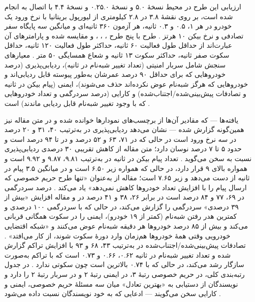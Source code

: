 ارزیابی این طرح در محیط  نسخهٔ ۵.۰ و  نسخهٔ ۰.۲۵.۰ و  نسخهٔ ۴.۴ با اتصال  به  انجام شده است، بر روی نقشهٔ ۳.۸ در ۲.۸ کیلومتری از لیورپول بریتانیا با نرخ ورود یک خودرو در هر ۱، ۰.۵ و ۰.۳ ثانیه، هر آزمون ۳۶۰ ثانیه‌ای و میانگین سه پایگاه سفر تصادفی و نرخ بیکن ۱۰ هرتز \cite{al-aniPrivacySafetyImprovement2023}. طرح  با پنج طرح ، ، ،  و  مقایسه شده و پارامترهای آن عبارت‌اند از حداقل طول فعالیت ۶۰ ثانیه، حداکثر طول فعالیت ۱۲۰ ثانیه، حداقل سکوت صفر ثانیه، حداکثر سکوت ۱۳ ثانیه و شعاع همسایگی ۵۰ متر \cite{al-aniPrivacySafetyImprovement2023}. معیارهای سنجش شامل سربار امنیتی (تعداد تغییر شبه‌نام در ثانیه)، ردیابی‌پذیری (درصد خودروهایی که برای حداقل ۹۰ درصد عمرشان به‌طور پیوسته قابل ردیابی‌اند و خودروهایی که هرگز شبه‌نام عوض نکرده‌اند حذف می‌شوند)، ایمنی (پیام بیکن در ثانیه و تصادفات پیش‌بینی‌شده/اجتناب‌شده) و کارایی (درصد سردرگمی و تعداد خودروهایی که با وجود تغییر شبه‌نام قابل ردیابی ماندند) است \cite{al-aniPrivacySafetyImprovement2023}.

یافته‌ها — که مقادیر آن‌ها از برچسب‌های نمودارها خوانده شده و در متن مقاله نیز همین‌گونه گزارش شده — نشان می‌دهد ردیابی‌پذیری در  به‌ترتیب ۴۰، ۳۱ و ۲۰ درصد در سه نرخ ورود است در حالی که در  ۷۱، ۶۳ و ۵۲ درصد و در  تا ۹۴ درصد است و  حدود ۵ تا ۷ درصد نوسان دارد؛ متن مقاله از کاهش تقریبی ۳۰ درصدی ردیابی‌پذیری نسبت به  سخن می‌گوید \cite{al-aniPrivacySafetyImprovement2023}. تعداد پیام بیکن در ثانیه در  به‌ترتیب ۹.۸۱، ۹.۸۷ و ۹.۹۲ است و همواره بالای ۹ قرار دارد، در حالی که  همواره زیر ۶.۵۰ است و در میانگین ۳.۵ پیام در ثانیه از دست می‌دهد و  زیر ۷.۶۵ است؛ مقاله از  به‌عنوان «تنها طرح حریم خصوصی که ارسال پیام را با افزایش تعداد خودروها کاهش نمی‌دهد» یاد می‌کند \cite{al-aniPrivacySafetyImprovement2023}. درصد سردرگمی در  ۶۹، ۷۷ و ۸۴ درصد است در برابر ۲۶، ۳۸ و ۴۱ درصد در  و مقاله افزایش «بیش از ۳۹ درصدی» سردرگمی را گزارش می‌کند، در حالی که  با سردرگمی ۱۰۰ درصدی و کمترین هدر رفتن شبه‌نام (کمتر از ۱۹ خودرو)، ایمنی را در سکوت همگانی قربانی می‌کند و بیش از ۸۵ درصد خودروها هر دقیقه شبه‌نام عوض می‌کنند و «شبکه اقتضایی خودرویی وقتی همهٔ خودروها هم‌زمان وارد دورهٔ سکوت شوند، از کار می‌افتد» \cite{al-aniPrivacySafetyImprovement2023}. تصادفات پیش‌بینی‌شده/اجتناب‌شده در  به‌ترتیب ۴۳، ۶۸ و ۹۳ با افزایش تراکم گزارش شده و تعداد تغییر شبه‌نام در ثانیه ۰.۶۲، ۰.۶۶ و ۰.۷۳ است که با تراکم به‌صورت سازگار رشد می‌کند، در حالی که  با ۰.۷۴ بالاترین است چون سکوتی ندارد \cite{al-aniPrivacySafetyImprovement2023}. در جدول رتبه‌بندی کلی،  در حریم خصوصی رتبهٔ ۳، در ایمنی رتبهٔ ۲ و در سربار رتبهٔ ۲ را دارد و نویسندگان از دستیابی به «بهترین تعادل» میان سه مسئلهٔ حریم خصوصی، ایمنی و کارایی سخن می‌گویند — ادعایی که به خود نویسندگان نسبت داده می‌شود \cite{al-aniPrivacySafetyImprovement2023}.

